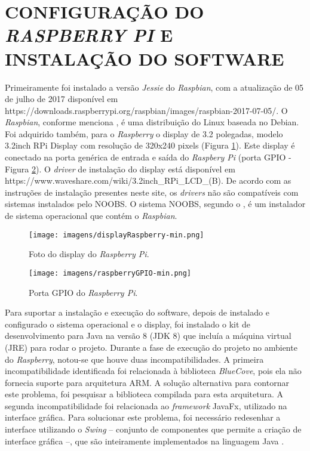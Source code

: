 \section{CONFIGURAÇÃO DO \textit{RASPBERRY PI} E INSTALAÇÃO DO SOFTWARE}
Primeiramente foi instalado a versão \textit{Jessie} do \textit{Raspbian}, com a atualização de 05 de julho de 2017 disponível em https://downloads.raspberrypi.org/raspbian/images/raspbian-2017-07-05/. O \textit{Raspbian}, conforme menciona , é uma distribuição do Linux baseada no Debian. Foi adquirido também, para o \textit{Raspberry} o display de 3.2 polegadas, modelo 3.2inch RPi Display com resolução de 320x240 pixels (Figura \ref{Fig:raspberry_display}). Este display é conectado na porta genérica de entrada e saída do \textit{Raspbery Pi} (porta GPIO - Figura \ref{Fig:raspberry_gpio}). O \textit{driver} de instalação do display está disponível em https://www.waveshare.com/wiki/3.2inch\_RPi\_LCD\_(B). De acordo com as instruções de instalação presentes neste site, os \textit{drivers} não são compatíveis com sistemas instalados pelo NOOBS. O sistema NOOBS, segundo o \citeauthor{raspberrypifoundation}, é um instalador de sistema operacional que contém o \textit{Raspbian}.

\begin{figure}[!ht]
\centering
\caption{Foto do display do \textit{Raspberry Pi}.} 
{\texttt{[image: imagens/displayRaspberry-min.png]}}\\
 \label{Fig:raspberry_display}
\end{figure}

\begin{figure}[!ht]
\centering
\caption{Porta GPIO do \textit{Raspberry Pi}.} 
{\texttt{[image: imagens/raspberryGPIO-min.png]}}\\
 \label{Fig:raspberry_gpio}
\end{figure}

Para suportar a instalação e execução do software, depois de instalado e configurado o sistema operacional e o display, foi instalado o kit de desenvolvimento para Java na versão 8 (JDK 8) que incluía a máquina virtual (JRE) para rodar o projeto. Durante a fase de execução do projeto no ambiente do \textit{Raspberry}, notou-se que houve duas incompatibilidades. A primeira incompatibilidade identificada foi relacionada à biblioteca \textit{BlueCove}, pois ela não fornecia suporte para arquitetura ARM. A solução alternativa para contornar este problema, foi pesquisar a biblioteca compilada para esta arquitetura. A segunda incompatibilidade foi relacionada ao \textit{framework} JavaFx, utilizado na interface gráfica. Para solucionar este problema, foi necessário redesenhar a interface utilizando o \textit{Swing} – conjunto de componentes que permite a criação de interface gráfica –, que são inteiramente implementados na linguagem Java \cite{oracle}.

